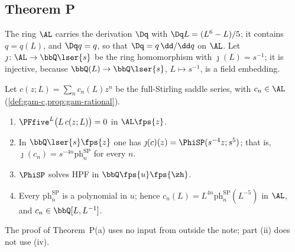 \subsection{Theorem P}
\label{sec:con-P}

The ring $\AL$ carries the derivation $\Dq$ with $\Dq L=(L^6-L)/5$; it contains $q=q(L)$, and $\Dq q=q$, so that $\Dq=q\,\dd/\dd q$ on $\AL$. Let $\jmath\colon\AL\to\bbQ\lser{s}$ be the ring homomorphism with $\jmath(L)=s^{-1}$; it is injective, because $\bbQ(L)\to\bbQ\lser{s}$, $L\mapsto s^{-1}$, is a field embedding.

\begin{thm}[Theorem P(a)]
\label{thm:con-Pa}
Let $c(z;L)=\sum_nc_n(L)z^n$ be the full-Stirling saddle series, with $c_n\in\AL$ (\cref{def:gam-c,prop:gam-rational}).
\begin{enumerate}
\item $\PFfive^{L}\bigl(L\,c(z;L)\bigr)=0$ in $\AL\fps{z}$.
\item In $\bbQ\lser{s}\fps{z}$ one has $\jmath(c)(z)=\PhiSP(s^{-4}z;s^5)$; that is, $\jmath(c_n)=s^{-4n}\mathrm{ph}^{\mathrm{SP}}_n$ for every $n$.
\item $\PhiSP$ solves HPF in $\bbQ\fps{u}\fps{\zh}$.
\item Every $\mathrm{ph}^{\mathrm{SP}}_n$ is a polynomial in $u$; hence $c_n(L)=L^{4n}\mathrm{ph}^{\mathrm{SP}}_n(L^{-5})$ in $\AL$, and $c_n\in\bbQ[L,L^{-1}]$.
\end{enumerate}
\end{thm}

The proof of Theorem~P(a) uses no input from outside the note; part (ii) does not use (iv).

